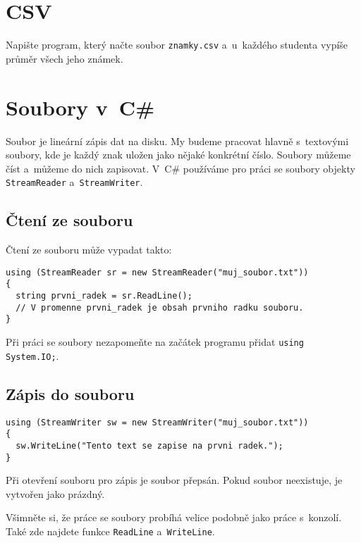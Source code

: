 \documentclass[12pt,a4paper]{article}
\begin{document}
\section{CSV}

Napište program, který načte soubor \texttt{znamky.csv} a~u~každého studenta
vypíše průměr všech jeho známek.

\newpage

\section*{Soubory v~C\#}

Soubor je lineární zápis dat na disku. My budeme pracovat hlavně s~textovými
soubory, kde je každý znak uložen jako nějaké konkrétní číslo. Soubory můžeme
číst a~můžeme do nich zapisovat. V~C\# používáme pro práci se soubory objekty
\texttt{StreamReader} a~\texttt{StreamWriter}.

\subsection*{Čtení ze souboru}

Čtení ze souboru může vypadat takto:

\begin{verbatim}
using (StreamReader sr = new StreamReader("muj_soubor.txt"))
{
  string prvni_radek = sr.ReadLine();
  // V promenne prvni_radek je obsah prvniho radku souboru.
}
\end{verbatim}

Při práci se soubory nezapomeňte na začátek programu přidat
\texttt{using System.IO;}.

\subsection*{Zápis do souboru}

\begin{verbatim}
using (StreamWriter sw = new StreamWriter("muj_soubor.txt"))
{
  sw.WriteLine("Tento text se zapise na prvni radek.");
}
\end{verbatim}

Při otevření souboru pro zápis je soubor přepsán. Pokud soubor neexistuje, je
vytvořen jako prázdný.

Všimněte si, že práce se soubory probíhá velice podobně jako práce s~konzolí.
Také zde najdete funkce \texttt{ReadLine} a~\texttt{WriteLine}.
\end{document}

